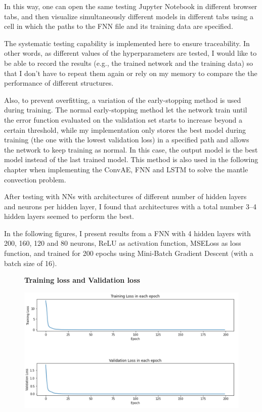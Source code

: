 In this way, one can open the same testing Jupyter Notebook in different browser tabs, and then visualize simultaneously different models in different tabs using a cell in which the paths to the FNN file and its training data are specified. 

The systematic testing capability is implemented here to ensure traceability. In other words, as different values of the hyperparameters are tested, I would like to be able to record the results (e.g., the trained network and the training data) so that I don't have to repeat them again or rely on my memory to compare the the performance of different structures.

Also, to prevent overfitting, a variation of the early-stopping method is used during training. The normal early-stopping method let the network train until the error function evaluated on the validation set starts to increase beyond a certain threshold\citep{10.1007_978-3-642-35289-8_5}, while my implementation only stores the best model during training (the one with the lowest validation loss) in a specified path and allows the network to keep training as normal. In this case, the output model is the best model instead of the last trained model. This method is also used in the following chapter when implementing the ConvAE, FNN and LSTM to solve the mantle convection problem.

After testing with NNs with architectures of different number of hidden layers and neurons per hidden layer, I found that architectures with a total number 3–4 hidden layers seemed to perform the best.

In the following figures, I present results from a FNN with 4 hidden layers with 200, 160, 120 and 80 neurons, ReLU as activation function, MSELoss as loss function, and trained for 200 epochs using Mini-Batch Gradient Descent (with a batch size of 16).

\begin{figure}[H]
    \textbf{Training loss and Validation loss}\par\medskip
    \includegraphics[scale=0.6]{Report LaTeX/figures/geoid_images/Geoid_trainingData.png}
\end{figure}

